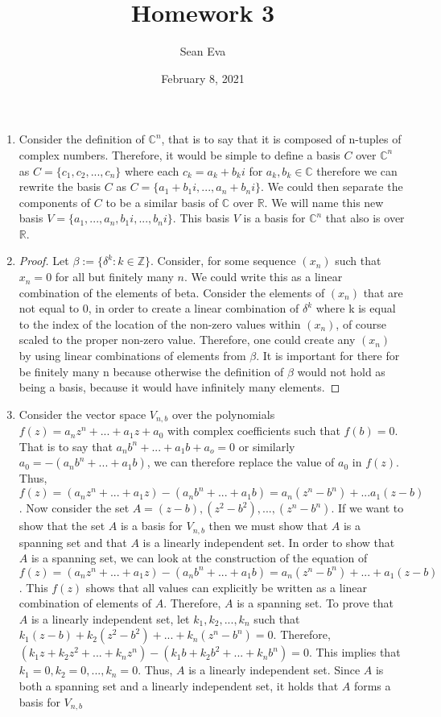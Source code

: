 \documentclass{article}
\title{Homework 3}
\author{Sean Eva}
\date{February 8, 2021}
\begin{document}
\maketitle

\begin{enumerate}
    \item
    
    Consider the definition of $\mathbb{C}^n$, that is to say that it is composed of n-tuples of complex numbers. Therefore, it would be simple to define a basis $C$ over $\mathbb{C}^n$ as $C=\{ c_1, c_2, ..., c_n\}$ where each $c_k = a_k+b_ki$ for $a_k, b_k\in \mathbb{C}$ therefore we can rewrite the basis $C$ as $C=\{a_1+b_1i, ..., a_n+b_ni\}$. We could then separate the components of $C$ to be a similar basis of $\mathbb{C}$ over $\mathbb{R}$. We will name this new basis $V = \{a_1, ..., a_n, b_1i, ..., b_ni\}$. This basis $V$ is a basis for $\mathbb{C}^n$ that also is over $\mathbb{R}$.
    
    \item 
    
    \begin{proof}
    Let $\beta := \{\delta^k: k\in\mathbb{Z}\}$. Consider, for some sequence $(x_n)$ such that $x_n=0$ for all but finitely many $n$. We could write this as a linear combination of the elements of beta. Consider the elements of $(x_n)$ that are not equal to $0$, in order to create a linear combination of $\delta^k$ where k is equal to the index of the location of the non-zero values within $(x_n)$, of course scaled to the proper non-zero value. Therefore, one could create any $(x_n)$ by using linear combinations of elements from $\beta$. It is important for there for be finitely many n because otherwise the definition of $\beta$ would not hold as being a basis, because it would have infinitely many elements.
    \end{proof}
    
    \item
    
    Consider the vector space $V_{n, b}$ over the polynomials $f(z)=a_nz^n+...+a_1z+a_0$ with complex coefficients such that $f(b)=0$. That is to say that $a_nb^n+...+a_1b+a_o=0$ or similarly $a_0 = -(a_nb^n+...+a_1b)$, we can therefore replace the value of $a_0$ in $f(z)$. Thus, $f(z)=(a_nz^n+...+a_1z)-(a_nb^n+...+a_1b)=a_n(z^n-b^n)+...a_1(z-b)$. Now consider the set $A={(z-b), (z^2-b^2),..., (z^n-b^n)}$. If we want to show that the set $A$ is a basis for $V_{n, b}$ then we must show that $A$ is a spanning set and that $A$ is a linearly independent set. In order to show that $A$ is a spanning set, we can look at the construction of the equation of $f(z)=(a_nz^n+...+a_1z)-(a_nb^n+...+a_1b)=a_n(z^n-b^n)+...+a_1(z-b)$. This $f(z)$ shows that all values can explicitly be written as a linear combination of elements of $A$. Therefore, $A$ is a spanning set. To prove that $A$ is a linearly independent set, let $k_1, k_2, ..., k_n$ such that $k_1(z-b)+k_2(z^2-b^2)+...+k_n(z^n-b^n)=0$. Therefore, $(k_1z+k_2z^2+...+k_nz^n)-(k_1b+k_2b^2+...+k_nb^n)=0$. This implies that $k_1=0, k_2=0, ..., k_n=0$. Thus, $A$ is a linearly independent set. Since $A$ is both a spanning set and a linearly independent set, it holds that $A$ forms a basis for $V_{n, b}$
    

\end{enumerate}
\end{document}
